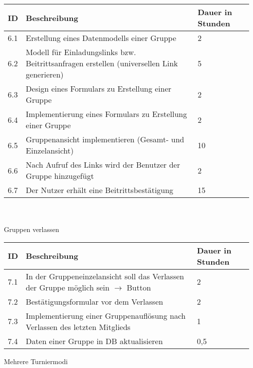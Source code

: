 \begin{tabular}[h]{|p{1cm}|p{10cm}|p{3cm}|}
\hline 
ID & Beschreibung & Dauer in Stunden \\ \hline 
6.1	& Erstellung eines Datenmodells einer Gruppe & 2 \\ \hline
6.2	& Modell für Einladungslinks bzw. Beitrittsanfragen erstellen (universellen Link generieren) & 5	 \\ \hline
6.3 & Design eines Formulars zu Erstellung einer Gruppe	& 2 \\ \hline	
6.4	& Implementierung eines Formulars zu Erstellung einer Gruppe & 2 \\ \hline
6.5 & Gruppenansicht implementieren (Gesamt- und Einzelansicht) & 10	\\ \hline
6.6 & Nach Aufruf des Links wird der Benutzer der Gruppe hinzugefügt	& 2 \\ \hline
6.7 & Der Nutzer erhält eine Beitrittsbestätigung & 15\\ \hline
\end{tabular}\\ \\
Gruppen verlassen\\
\begin{tabular}[h]{|p{1cm}|p{10cm}|p{3cm}|}
\hline 
ID & Beschreibung & Dauer in Stunden \\ \hline 
7.1	& In der Gruppeneinzelansicht soll das Verlassen der Gruppe möglich sein $\rightarrow$ Button	& 2\\ \hline
7.2 & Bestätigungsformular vor dem Verlassen & 2 \\ \hline
7.3	& Implementierung einer Gruppenauflösung nach Verlassen des letzten Mitglieds & 1\\ \hline
7.4 & Daten einer Gruppe in DB aktualisieren & 0,5\\ \hline
\end{tabular}\newpage
Mehrere Turniermodi\\
